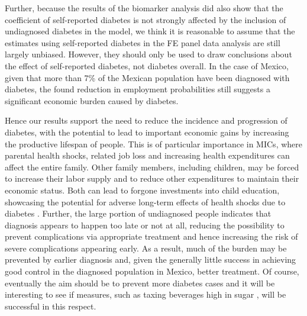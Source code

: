 \documentclass[12pt,english]{article}
\begin{document}
Further, because the results of the biomarker analysis did also show that the coefficient of self-reported diabetes is not strongly affected by the inclusion of undiagnosed diabetes in the model, we think it is reasonable to assume that the estimates using self-reported diabetes in the \ac{FE} panel data analysis are still largely unbiased. However, they should only be used to draw conclusions about the effect of self-reported diabetes, not diabetes overall. In the case of Mexico, given that more than 7\% of the Mexican population have been diagnosed with diabetes, the found reduction in employment probabilities still suggests a significant economic burden caused by diabetes.

Hence our results support the need to reduce the incidence and progression of diabetes, with the potential to lead to important economic gains by increasing the productive lifespan of people. This is of particular importance in \ac{MICs}, where parental health shocks, related job loss and increasing health expenditures can affect the entire family. Other family members, including children, may be forced to increase their labor supply and to reduce other expenditures to maintain their economic status. Both can lead to forgone investments into child education, showcasing the potential for adverse long-term effects of health shocks due to diabetes \parencite{Bratti2014}. Further, the large portion of undiagnosed people indicates that diagnosis appears to happen too late or not at all, reducing the possibility to prevent complications via appropriate treatment and hence increasing the risk of severe complications appearing early. As a result, much of the burden may be prevented by earlier diagnosis and, given the generally little success in achieving good control in the diagnosed population in Mexico, better treatment. Of course, eventually the aim should be to prevent more diabetes cases and it will be interesting to see if measures, such as taxing beverages high in sugar \parencite{}, will be successful in this respect.
\end{document}
